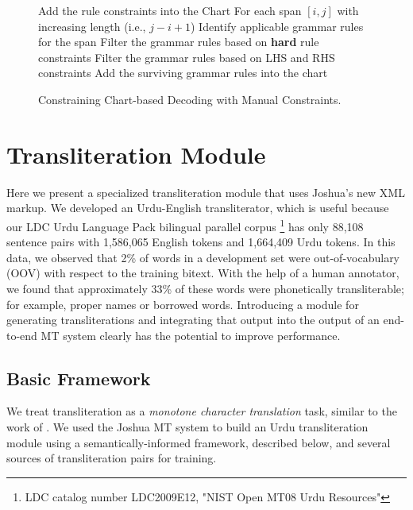 \documentclass[logo]{pbml}
\begin{document}
\begin{figure}[t]
\begin{center}
\begin{codebox}
\li Add the \textrm{rule} constraints into the Chart \label{line1}
\li For each \textrm{span} $[i,j]$ with increasing length (i.e., $j-i+1$)
\li \> Identify applicable grammar rules for the span
\li \> Filter the grammar rules based on \textbf{hard} \textrm{rule} constraints \label{line2}
\li \> Filter the grammar rules based on \textrm{LHS} and \textrm{RHS} constraints \label{line3}
\li \> Add the surviving grammar rules into the chart
\end{codebox}
\end{center}
\caption{Constraining Chart-based Decoding with Manual Constraints.}
\label{alg-constraint-decoding}
\vspace{-0.1in}
\end{figure}

\section{Transliteration Module}
Here we present a specialized transliteration module that uses Joshua's new XML markup. We developed an Urdu-English transliterator, which is useful because our LDC Urdu Language Pack bilingual parallel corpus \footnote{LDC catalog number LDC2009E12, "NIST Open MT08 Urdu Resources"} has only 88,108 sentence pairs with 1,586,065 English tokens and 1,664,409 Urdu tokens. In this data, we observed that 2\% of words in a development set were out-of-vocabulary (OOV) with respect to the training bitext. With the help of a human annotator, we found that approximately 33\% of these words were phonetically transliterable; for example, proper names or borrowed words. Introducing a module for generating transliterations and integrating that output into the output of an end-to-end MT system clearly has the potential to improve performance.

\subsection{Basic Framework} \label{transliteration-framework}
We treat transliteration as a \emph{monotone character translation} task, similar to the work of \cite{Knight1997}. We used the Joshua MT system to build an Urdu transliteration module using a semantically-informed framework, described below, and several sources of transliteration pairs for training.
\end{document}
